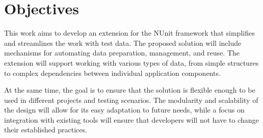 \section{Objectives}

This work aims to develop an extension for the NUnit framework that simplifies and streamlines the work with test data. The proposed solution will include mechanisms for automating data preparation, management, and reuse. The extension will support working with various types of data, from simple structures to complex dependencies between individual application components.

At the same time, the goal is to ensure that the solution is flexible enough to be used in different projects and testing scenarios. The modularity and scalability of the design will allow for its easy adaptation to future needs, while a focus on integration with existing tools will ensure that developers will not have to change their established practices.